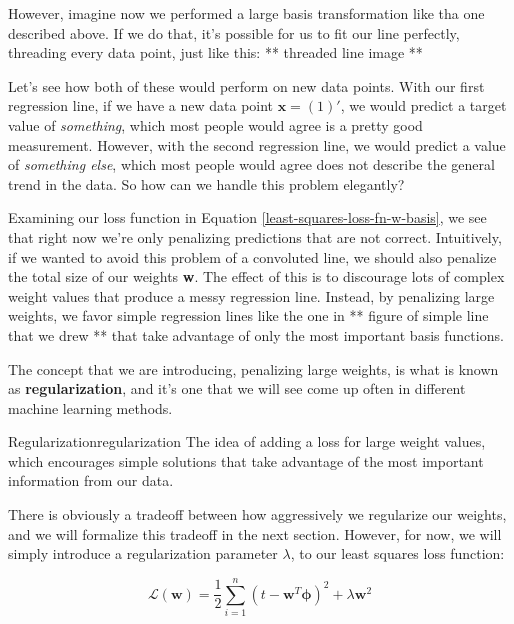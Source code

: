However, imagine now we performed a large basis transformation like tha one described above. If we do that, it's possible for us to fit our line perfectly, threading every data point, just like this:
** threaded line image **

Let's see how both of these would perform on new data points. With our first regression line, if we have a new data point $\textbf{x} = (1)'$, we would predict a target value of \textit{something}, which most people would agree is a pretty good measurement. However, with the second regression line, we would predict a value of \textit{something else}, which most people would agree does not describe the general trend in the data. So how can we handle this problem elegantly?

Examining our loss function in Equation \ref{least-squares-loss-fn-w-basis}, we see that right now we're only penalizing predictions that are not correct. Intuitively, if we wanted to avoid this problem of a convoluted line, we should also penalize the total size of our weights \textbf{w}. The effect of this is to discourage lots of complex weight values that produce a messy regression line. Instead, by penalizing large weights, we favor simple regression lines like the one in ** figure of simple line that we drew ** that take advantage of only the most important basis functions.

The concept that we are introducing, penalizing large weights, is what is known as \textbf{regularization}, and it's one that we will see come up often in different machine learning methods.

\begin{definition}{Regularization}{regularization}
    The idea of adding a loss for large weight values, which encourages simple solutions that take advantage of the most important information from our data.
\end{definition}

There is obviously a tradeoff between how aggressively we regularize our weights, and we will formalize this tradeoff in the next section. However, for now, we will simply introduce a regularization parameter $\lambda$, to our least squares loss function:

\begin{equation} \label{least-squares-loss-fn-w-regularization}
    \mathcal{L}(\textbf{w}) = \frac{1}{2} \sum_{i=1}^{n} (t - \textbf{w}^{T}\boldsymbol{\phi})^2 + \lambda\textbf{w}^{2}
\end{equation}


